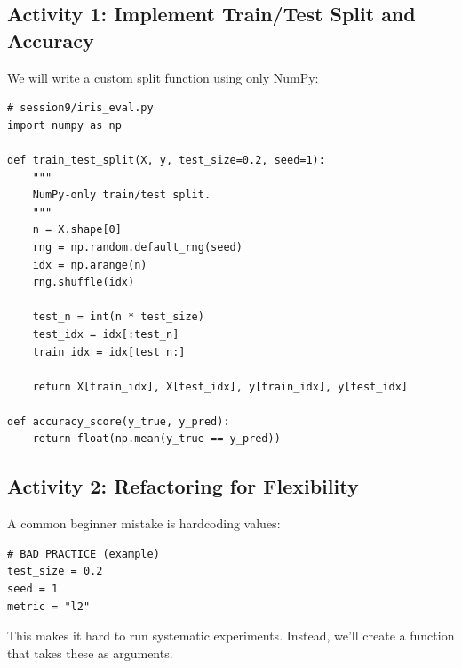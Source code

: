 \newpage
\subsection{Activity 1: Implement Train/Test Split and Accuracy}

\begin{tcolorbox}[title=Do: Create \texttt{session9/iris\_eval.py}]
We will write a custom split function using only NumPy:
\begin{verbatim}
# session9/iris_eval.py
import numpy as np

def train_test_split(X, y, test_size=0.2, seed=1):
    """
    NumPy-only train/test split.
    """
    n = X.shape[0]
    rng = np.random.default_rng(seed)
    idx = np.arange(n)
    rng.shuffle(idx)

    test_n = int(n * test_size)
    test_idx = idx[:test_n]
    train_idx = idx[test_n:]

    return X[train_idx], X[test_idx], y[train_idx], y[test_idx]

def accuracy_score(y_true, y_pred):
    return float(np.mean(y_true == y_pred))
\end{verbatim}
\end{tcolorbox}

\newpage
\subsection{Activity 2: Refactoring for Flexibility}

A common beginner mistake is hardcoding values:
\begin{verbatim}
# BAD PRACTICE (example)
test_size = 0.2
seed = 1
metric = "l2"
\end{verbatim}

This makes it hard to run systematic experiments. Instead, we'll create a function that takes these as arguments.

